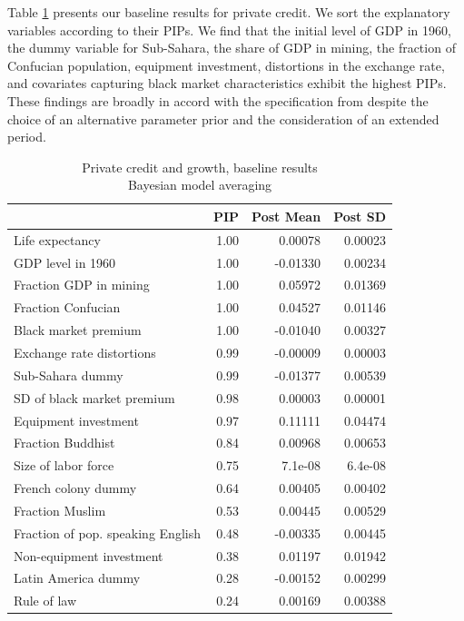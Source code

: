 Table \ref{ch2tab:PC6011hyp} presents our baseline results for private credit. We sort the explanatory variables according to their \acp{PIP}. We find that the initial level of \ac{GDP} in 1960, the dummy variable for Sub-Sahara, the share of GDP in mining, the fraction of Confucian population, equipment investment, distortions in the exchange rate, and covariates capturing black market characteristics exhibit the highest \acp{PIP}. These findings are broadly in accord with the specification from \citet{Fernandezetal2001} despite the choice of an alternative parameter prior and the consideration of an extended period. 
%
\begin{table}[!ht]
	\centering
	\caption{Private credit and growth, baseline results\\
		Bayesian model averaging}
	\label{ch2tab:PC6011hyp}
	\small
	\begin{tabular}{lrrr}
		\toprule
		& PIP & Post Mean & Post SD \\ 
		\toprule
		Life expectancy & 1.00 & 0.00078 & 0.00023 \\ 
		GDP level in 1960 & 1.00 & -0.01330 & 0.00234 \\ 
		Fraction GDP in mining & 1.00 & 0.05972 & 0.01369 \\ 
		Fraction Confucian & 1.00 & 0.04527 & 0.01146 \\ 
		Black market premium & 1.00 & -0.01040 & 0.00327 \\ 
		Exchange rate distortions & 0.99 & -0.00009 & 0.00003 \\ 
		Sub-Sahara dummy & 0.99 & -0.01377 & 0.00539 \\ 
		SD of black market premium & 0.98 & 0.00003 & 0.00001 \\ 
		Equipment investment & 0.97 & 0.11111 & 0.04474 \\ 
		Fraction Buddhist & 0.84 & 0.00968 & 0.00653 \\ 
		Size of labor force & 0.75 & 7.1e-08 & 6.4e-08 \\ 
		French colony dummy & 0.64 & 0.00405 & 0.00402 \\ 
		Fraction Muslim & 0.53 & 0.00445 & 0.00529 \\ 
		Fraction of pop. speaking English & 0.48 & -0.00335 & 0.00445 \\ 
		Non-equipment investment & 0.38 & 0.01197 & 0.01942 \\ 
		Latin America dummy & 0.28 & -0.00152 & 0.00299 \\ 
		Rule of law & 0.24 & 0.00169 & 0.00388 \\ 

\end{tabular}
\end{table}
